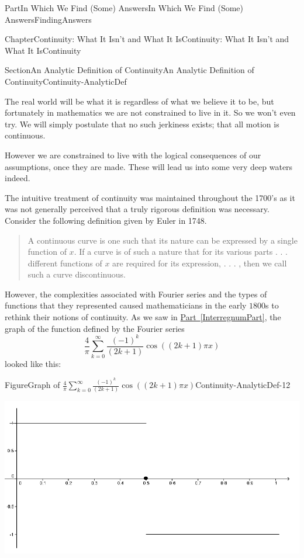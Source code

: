 \documentclass[oneside,10pt,]{book}
\newcommand{\xreffont}{\relax}
\numberwithin{equation}{part}
\begin{document}
\begin{partptx}{Part}{In Which We Find (Some) Answers}{}{In Which We Find (Some) Answers}{}{}{FindingAnswers}
\begin{chapterptx}{Chapter}{Continuity: What It Isn't and What It Is}{}{Continuity: What It Isn't and What It Is}{}{}{Continuity}
\begin{sectionptx}{Section}{An Analytic Definition of Continuity}{}{An Analytic Definition of Continuity}{}{}{Continuity-AnalyticDef}
\par
The real world will be what it is regardless of what we believe it to be, but fortunately in mathematics we are not constrained to live in it.  So we won't even try.  We will simply postulate that no such jerkiness exists; that all motion is continuous.%
\par
However we are constrained to live with the logical consequences of our assumptions, once they are made.  These will lead us into some very deep waters indeed.%
\par
The intuitive treatment of continuity was maintained throughout the 1700's as it was not generally perceived that a truly rigorous definition was necessary.  Consider the following definition given by Euler in 1748.%
\begin{quote}%
A continuous curve is one such that its nature can be expressed by a single function of \(x.\) If a curve is of such a nature that for its various parts . . . different functions of \(x\) are required for its expression, . . . , then we call such a curve discontinuous.%
\end{quote}
However, the complexities associated with Fourier series and the types of functions that they represented caused mathematicians in the early \(1800\)s to rethink their notions of continuity.  As we saw in \hyperref[InterregnumPart]{Part~{\xreffont\ref{InterregnumPart}}}, the graph of the function defined by the Fourier series%
\begin{equation*}
\frac{4}{\pi}\sum_{k=0}^\infty\frac{\left(-1\right)^k}{\left(2k+1\right)} \cos \left(\left(2k+1\right)\pi x\right)
\end{equation*}
looked like this:%
\begin{figureptx}{Figure}{Graph of \(\frac{4}{\pi}\sum_{k=0}^\infty\frac{\left(-1\right)^k}{\left(2k+1\right)} \cos \left(\left(2k+1\right)\pi x\right)\)}{Continuity-AnalyticDef-12}{}%
\begin{image}{0.125}{0.75}{0.125}{}%
\includegraphics[width=\linewidth]{external/images/Ch5fig1.png}

\end{image}
\end{figureptx}
\end{sectionptx}
\end{chapterptx}
\end{partptx}
\end{document}
